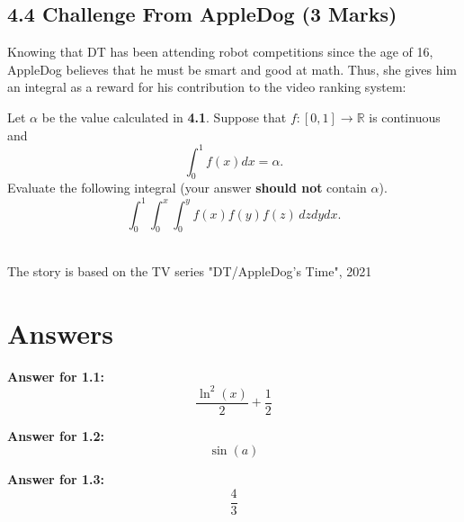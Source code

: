 \documentclass[12pt]{article}
\renewcommand{\emph}[1]{{\color{Turquoise3}\textsl{#1}}}
\begin{document}
\subsection*{4.4 Challenge From AppleDog (3 Marks)}
\par Knowing that DT has been attending robot competitions since the age of 16, AppleDog believes that he must be smart and good at math. Thus, she gives him an integral as a reward for his contribution to the video ranking system: 

Let \emph{$\alpha$} be the value calculated in \textbf{4.1}. Suppose that $f:[0,1] \to \mathbb{R}$ is continuous and 
\begin{equation*}
    \int_0^1 f(x) dx = \alpha. 
\end{equation*}
Evaluate the following integral (your answer \textbf{should not} contain \emph{$\alpha$}). 
\begin{equation*}
    \int_0^1 \int_0^x \int_0^y f(x)f(y)f(z)\,dzdydx. 
\end{equation*} 
~\\ 

\begin{flushright}
    The story is based on the TV series "DT/AppleDog's Time", 2021
\end{flushright}


\newpage
\section*{Answers}

\par \textbf{Answer for 1.1: }
\begin{equation*}
    \frac{\ln^2(x)}{2} + \frac{1}{2}
\end{equation*}

\par \textbf{Answer for 1.2: }
\begin{equation*}
    \sin(a)
\end{equation*}

\par \textbf{Answer for 1.3: }
\begin{equation*}
    \frac{4}{3}
\end{equation*}
\end{document}
